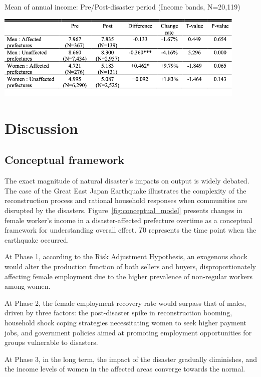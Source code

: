 \documentclass[a4paper,12pt]{article}
\begin{document}
\begin{table}[h!]
    \centering
    \caption{Mean of annual income: Pre/Post-disaster period (Income bands, N=20,119)}
    \label{tab:annual_income}
    \includegraphics[width=0.9\textwidth]{Annual income table.png}  %
    \label{table:mean_of_annual_income}
\end{table}

\newpage

\section{Discussion}
\label{sec5}

\subsection{Conceptual framework}
\label{sec5.1}

The exact magnitude of natural disaster's impacts on output is widely debated. The case of the Great East Japan Earthquake illustrates the complexity of the reconstruction process and rational household responses when communities are disrupted by the disasters. Figure~\ref{fig:conceptual_model} presents changes in female worker's income in a disaster-affected prefecture overtime as a conceptual framework for understanding overall effect. $T0$ represents the time point when the earthquake occurred. 

At Phase 1, according to the Risk Adjustment Hypothesis, an exogenous shock would alter the production function of both sellers and buyers, disproportionately affecting female employment due to the higher prevalence of non-regular workers among women.

At Phase 2, the female employment recovery rate would surpass that of males, driven by three factors: the post-disaster spike in reconstruction booming, household shock coping strategies necessitating women to seek higher payment jobs, and government policies aimed at promoting employment opportunities for groups vulnerable to disasters.

At Phase 3, in the long term, the impact of the disaster gradually diminishes, and the income levels of women in the affected areas converge towards the normal.
\end{document}
